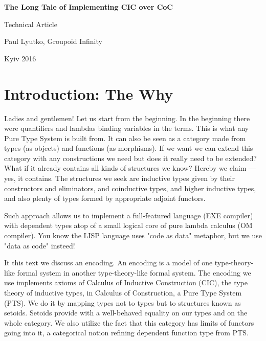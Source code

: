 \documentclass[11pt,oneside]{article}
\begin{document}
\thispagestyle{empty}
\begin{center}
\vspace{3cm}
    \vspace{3cm}   {\Large \bf The Long Tale of Implementing CIC over CoC\\}\par
    \vspace{0.3cm} {\Large Technical Article\par}
    \vspace{0.3cm} {\Large Paul Lyutko, Groupoid Infinity\par}
    \vspace{4cm}   {\Large Kyiv 2016}
\end{center}

\newpage
\vspace{2cm}
\tableofcontents

\newpage
\section{Introduction: The Why}

Ladies and gentlemen! Let us start from the beginning.
In the beginning there were quantifiers and lambdas binding variables in the terms.
This is what any Pure Type System is built from.
It can also be seen as a category made from types (as objects) and functions (as morphisms).
If we want we can extend this category with any constructions
we need but does it really need to be extended?
What if it already contains all kinds of structures we know?
Hereby we claim --- yes, it contains.
The structures we seek are inductive types given by their constructors and eliminators,
and coinductive types, and higher inductive types, and also
plenty of types formed by appropriate adjoint functors.

Such approach allows us to implement a full-featured language (EXE compiler)
with dependent types atop of a small logical core of pure lambda calculus (OM compiler).
You know the LISP language uses "code as data" metaphor, but we use "data as code" insteed!

It this text we discuss an encoding. An encoding is a model of one type-theory-like formal
system in another type-theory-like formal system. The encoding we use implements axioms
of Calculus of Inductive Construction (CIC), the type theory of inductive types,
in Calculus of Construction, a Pure Type System (PTS).
We do it by mapping types not to types but to structures known
as setoids. Setoids provide with a well-behaved equality on our types and on the whole category.
We also utilize the fact that this category has limits of functors going into it,
a categorical notion refining dependent function type from PTS.
\end{document}
